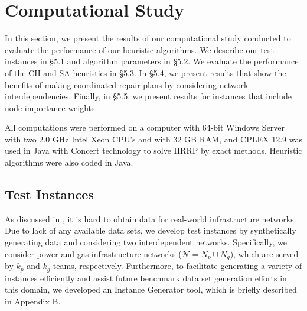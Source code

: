 \documentclass[11pt]{article}
\begin{document}
\section{Computational Study} \label{num_analysis}

In this section, we present the results of our computational study conducted to evaluate the performance of our heuristic algorithms. We describe our test instances in \S 5.1 and algorithm parameters in \S 5.2. We evaluate the performance of the CH and SA heuristics in \S 5.3. In \S 5.4, we present results that show the benefits of making coordinated repair plans by considering network interdependencies. Finally, in \S 5.5, we present results for instances that include node importance weights.

All computations were performed on a computer with 64-bit Windows Server with two 2.0 GHz Intel Xeon CPU’s and with 32 GB RAM, and CPLEX 12.9 was used in Java with Concert technology to solve IIRRP by exact methods. Heuristic algorithms were also coded in Java.

\subsection{Test Instances} \label{Test_instances}


As discussed in \citet{almoghathawi2019resilience}, it is hard to obtain data for real-world infrastructure networks. Due to lack of any available data sets, we develop test instances by synthetically generating data and considering two interdependent networks. Specifically, we consider power and gas infrastructure networks ($\mathcal{N} = {N}_{p} \cup {N}_{g}$), which are served by $k_{p}$ and $k_{g}$ teams, respectively. Furthermore, to facilitate generating a variety of instances efficiently and assist future benchmark data set generation efforts in this domain, we developed an Instance Generator tool, which is briefly described in Appendix B. 

\end{document}
